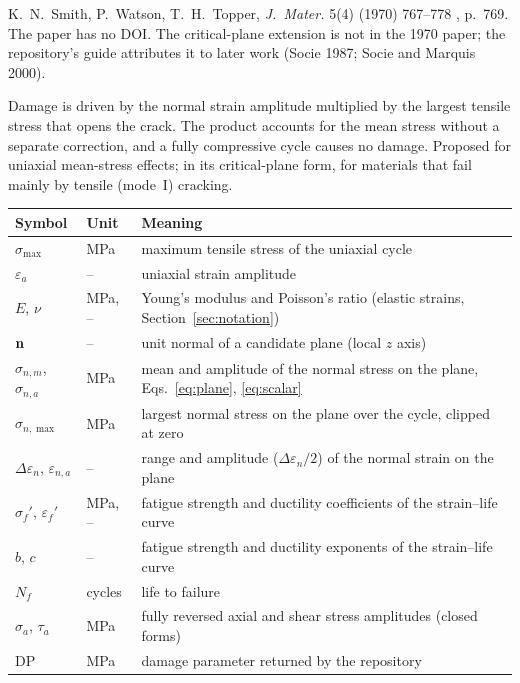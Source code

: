 \label{sheet:SWT}

 K.~N.~Smith, P.~Watson, T.~H.~Topper, \emph{J.\ Mater.} 5(4) (1970) 767--778
\cite{smith1970}, p.~769. The paper has no DOI. The critical-plane extension is not in the 1970
paper; the repository's guide attributes it to later work (Socie 1987; Socie and Marquis 2000).

 Damage is driven by the normal strain amplitude multiplied by the largest
tensile stress that opens the crack. The product accounts for the mean stress without a separate
correction, and a fully compressive cycle causes no damage. Proposed for uniaxial mean-stress
effects; in its critical-plane form, for materials that fail mainly by tensile (mode~I) cracking.

\begin{center}\small
\begin{tabular}{@{}llp{100mm}@{}}
\toprule
Symbol & Unit & Meaning\\\midrule
$\sigma_{\max}$ & MPa & maximum tensile stress of the uniaxial cycle\\
$\varepsilon_a$ & -- & uniaxial strain amplitude\\
$E$, $\nu$ & MPa, -- & Young's modulus and Poisson's ratio (elastic strains, Section~\ref{sec:notation})\\
$\mathbf n$ & -- & unit normal of a candidate plane (local $z$ axis)\\
$\sigma_{n,m}$, $\sigma_{n,a}$ & MPa & mean and amplitude of the normal stress on the plane, Eqs.~\eqref{eq:plane}, \eqref{eq:scalar}\\
$\sigma_{n,\max}$ & MPa & largest normal stress on the plane over the cycle, clipped at zero\\
$\Delta\varepsilon_n$, $\varepsilon_{n,a}$ & -- & range and amplitude ($\Delta\varepsilon_n/2$) of the normal strain on the plane\\
$\sigma_f'$, $\varepsilon_f'$ & MPa, -- & fatigue strength and ductility coefficients of the strain--life curve\\
$b$, $c$ & -- & fatigue strength and ductility exponents of the strain--life curve\\
$N_f$ & cycles & life to failure\\
$\sigma_a$, $\tau_a$ & MPa & fully reversed axial and shear stress amplitudes (closed forms)\\
$\mathrm{DP}$ & MPa & damage parameter returned by the repository\\
\bottomrule
\end{tabular}
\end{center}

